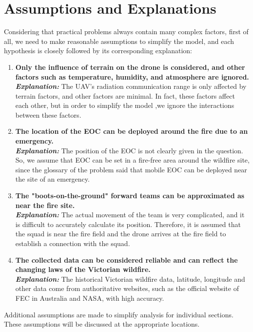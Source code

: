 \documentclass[12pt]{article}  %
\begin{document}

\section{Assumptions and Explanations}
Considering that practical problems always contain many complex factors, first of all, we need to make reasonable assumptions to simplify the model, and each hypothesis is closely followed by its corresponding explanation:

\begin{enumerate}
	\item \textbf{Only the influence of terrain on the drone is considered, and other factors such as temperature, humidity, and atmosphere are ignored.}\\
	\textbf{\textit{Explanation: }}The UAV's radiation communication range is only affected by terrain factors, and other factors are minimal. In fact, these factors affect each other, but in order to simplify the model ,we ignore the interactions between these factors.
	\item \textbf{The location of the EOC can be deployed around the fire due to an emergency.}\\
	\textbf{\textit{Explanation: }}The position of the EOC is not clearly given in the question. So, we assume that EOC can be set in a fire-free area around the wildfire site, since the glossary of the problem said that mobile EOC can be deployed near the site of an emergency.
	\item \textbf{The "boots-on-the-ground" forward teams can be approximated as near the fire site.}\\
	\textbf{\textit{Explanation: }}The actual movement of the team is very complicated, and it is difficult to accurately calculate its position. Therefore, it is assumed that the squad is near the fire field and the drone arrives at the fire field to establish a connection with the squad.
	\item \textbf{The collected data can be considered reliable and can reflect the changing laws of the Victorian wildfire.}\\
	\textbf{\textit{Explanation: }}The historical Victorian wildfire data, latitude, longitude and other data come from authoritative websites, such as the official website of FEC in Australia and NASA, with high accuracy.
\end{enumerate}
Additional assumptions are made to simplify analysis for individual sections. These assumptions will be discussed at the appropriate locations.
\end{document}
